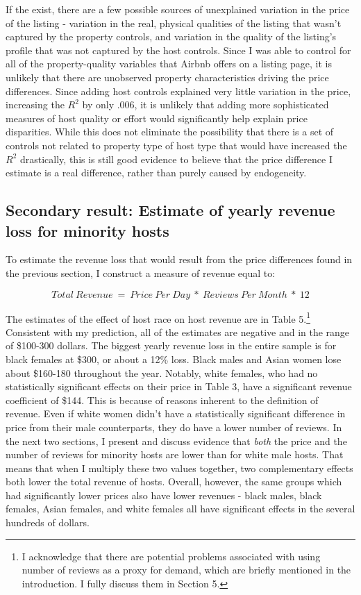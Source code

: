 If the exist, there are a few possible sources of unexplained variation in the price of the listing - variation in the real, physical qualities of the listing that wasn't captured by the property controls, and variation in the quality of the listing's profile that was not captured by the host controls. Since I was able to control for all of the property-quality variables that Airbnb offers on a listing page, it is unlikely that there are unobserved property characteristics driving the price differences. Since adding host controls explained very little variation in the price, increasing the $R^2$ by only .006, it is unlikely that adding more sophisticated measures of host quality or effort would significantly help explain price disparities. While this does not eliminate the possibility that there is a set of controls not related to property type of host type that would have increased the $R^2$ drastically, this is still good evidence to believe that the price difference I estimate is a real difference, rather than purely caused by endogeneity. 


\subsection{Secondary result: Estimate of yearly revenue loss for minority hosts}

To estimate the revenue loss that would result from the price differences found in the previous section, I construct a measure of revenue equal to: 

\[Total \: Revenue \ = \ Price \: Per \: Day \ * \ Reviews \: Per \: Month \ * \ 12\] 

The estimates of the effect of host race on host revenue are in Table 5.\footnote{I acknowledge that there are potential problems associated with using number of reviews as a proxy for demand, which are briefly mentioned in the introduction. I fully discuss them in Section 5.} Consistent with my prediction, all of the estimates are negative and in the range of \$100-300 dollars. The biggest yearly revenue loss in the entire sample is for black females at \$300, or about a 12\% loss. Black males and Asian women lose about \$160-180 throughout the year. Notably, white females, who had no statistically significant effects on their price in Table 3, have a significant revenue coefficient of \$144. This is because of reasons inherent to the definition of revenue. Even if white women didn't have a statistically significant difference in price from their male counterparts, they do have a lower number of reviews. In the next two sections, I present and discuss evidence that \textit{both} the price and the number of reviews for minority hosts are lower than for white male hosts. That means that when I multiply these two values together, two complementary effects both lower the total revenue of hosts. Overall, however, the same groups which had significantly lower prices also have lower revenues - black males, black females, Asian females, and white females all have significant effects in the several hundreds of dollars. 
 


